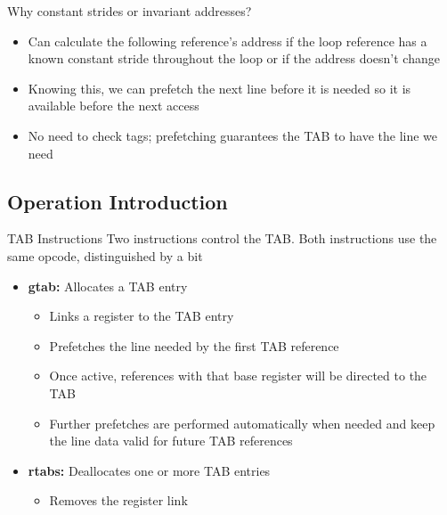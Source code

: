 \documentclass{beamer}
\begin{document}
\begin{frame}{Why constant strides or invariant addresses?}
   \begin{itemize}
      \item Can calculate the following reference's address if the loop reference
         has a known constant stride throughout the loop or if the address 
         doesn't change
      \item Knowing this, we can prefetch the next line before it is needed so
         it is available before the next access
      \item No need to check tags; prefetching guarantees the TAB to have the line 
         we need
   \end{itemize}
\end{frame}
\subsection{Operation Introduction}
\begin{frame}{TAB Instructions}
   Two instructions control the TAB. Both instructions use the same opcode,
   distinguished by a bit
   \begin{itemize}
      \item \textbf{gtab:} Allocates a TAB entry
         \begin{itemize}
            \item Links a register to the TAB entry
            \item Prefetches the line needed by the first TAB reference
            \item Once active, references with that base register will be directed to the TAB
            \item Further prefetches are performed automatically when needed and keep
               the line data valid for future TAB references
         \end{itemize}
      \item \textbf{rtabs:} Deallocates one or more TAB entries
         \begin{itemize}
            \item Removes the register link
         \end{itemize}
   \end{itemize}
\end{frame}
\end{document}
